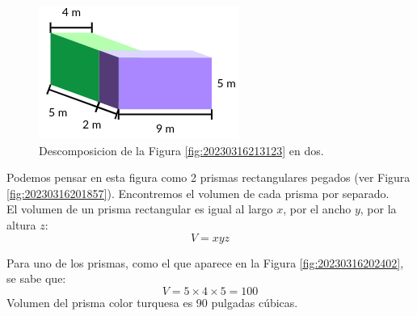 \begin{solutionbox}{16cm}
    \begin{minipage}[t]{.3\textwidth}
        \begin{figure}[H]
            \centering
            \includegraphics[width=0.9\linewidth]{../images/20230316213201}
            \caption{Descomposicion de la Figura \ref{fig:20230316213123} en dos.}
            \label{fig:20230316213201}
        \end{figure}
    \end{minipage}\hfill
    \begin{minipage}[t]{.55\textwidth}
        Podemos pensar en esta figura como 2 prismas rectangulares pegados (ver Figura \ref{fig:20230316201857}). Encontremos el volumen de cada prisma por separado.\\
        El volumen de un prisma rectangular es igual al largo $x$, por el ancho $y$, por la altura $z$:
        \[ V = xyz \]

        Para uno de los prismas, como el que aparece en la Figura \ref{fig:20230316202402}, se sabe que:\\
        \[ V = 5\times 4\times 5=100\]
        Volumen del prisma color turquesa es 90 pulgadas cúbicas.\\


\end{minipage}
\end{solutionbox}
